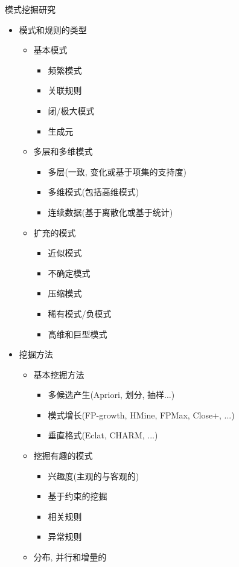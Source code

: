 \documentclass{article}
\begin{document}
\bigskip
模式挖掘研究
\begin{itemize}
	\item 模式和规则的类型
		\begin{itemize}
			\item 基本模式
				\begin{itemize}
					\item 频繁模式
					\item 关联规则
					\item 闭/极大模式
					\item 生成元
				\end{itemize}
			\item 多层和多维模式
				\begin{itemize}
					\item 多层(一致, 变化或基于项集的支持度)
					\item 多维模式(包括高维模式)
					\item 连续数据(基于离散化或基于统计)
				\end{itemize}
			\item 扩充的模式
				\begin{itemize}
					\item 近似模式
					\item 不确定模式
					\item 压缩模式
					\item 稀有模式/负模式
					\item 高维和巨型模式
				\end{itemize}
		\end{itemize}
	\item 挖掘方法
		\begin{itemize}
			\item 基本挖掘方法
				\begin{itemize}
					\item 多候选产生(Apriori, 划分, 抽样...)
					\item 模式增长(FP-growth, HMine, FPMax, Close+, ...)
					\item 垂直格式(Eclat, CHARM, ...)
				\end{itemize}
			\item 挖掘有趣的模式
				\begin{itemize}
					\item 兴趣度(主观的与客观的)
					\item 基于约束的挖掘
					\item 相关规则
					\item 异常规则
				\end{itemize}
			\item 分布, 并行和增量的

\end{itemize}
\end{itemize}
\end{document}
